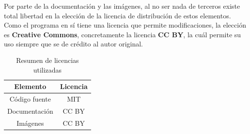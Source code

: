 Por parte de la documentación y las imágenes, al no ser nada de terceros existe total libertad en la elección de la licencia de distribución de estos elementos. 
Como el programa en sí tiene una licencia que permite modificaciones, la elección es \textbf{Creative Commons}, concretamente la licencia \textbf{CC BY}, la cuál permite su uso siempre que se de crédito al autor original.

\begin{table}[ht]
    \centering
    \begin{tabular}{cc}
        \toprule
         Elemento & Licencia\\
         \midrule
         Código fuente & MIT\\
         Documentación & CC BY\\
         Imágenes & CC BY \\
         \bottomrule
    \end{tabular}
    \caption{Resumen de licencias utilizadas}
\end{table}